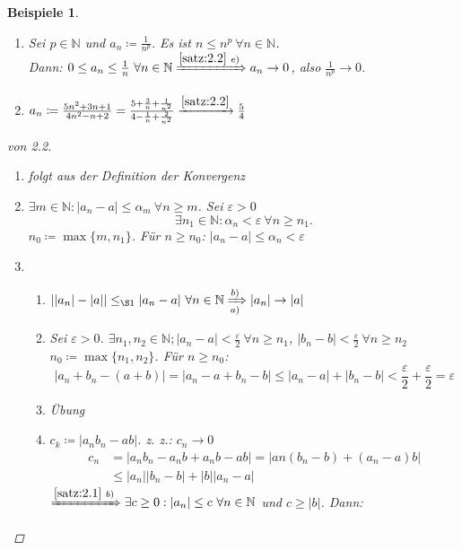 \documentclass[titlepage,ngerman,a4paper,headsepline,DIV15,halfparskip*,14pt]{scrartcl}
\newcommand{\N}{\mathbb{N}}
\theoremstyle{dotless}
\newtheorem*{beispiele}{Beispiele}
\begin{document}
\begin{beispiele}\
	\begin{enumerate}
		\item Sei $p \in \N$ und $a_{n} \coloneqq \frac{1}{n^{p}}$. Es ist $n \leq n^{p} ~\forall n \in \N$. \\
			Dann: $0 \leq a_{n} \leq \frac{1}{n} ~\forall n \in \N \xRightarrow[]{\ref{satz:2.2}~e)} a_{n} \rightarrow 0$, also $\frac{1}{n^{p}} \rightarrow 0$.
		\item $a_{n} \coloneqq \frac{5n^{2} + 3n + 1}{4n^{2} - n + 2} = \frac{5 + \frac{3}{n} + \frac{1}{n^{2}}}{4 - \frac{1}{n} + \frac{2}{n^{2}}} \xrightarrow[]{\ref{satz:2.2}} \frac{5}{4}$
	\end{enumerate}
	
	\begin{proof}[von 2.2]\
		\begin{enumerate}
			\item folgt aus der Definition der Konvergenz
			\item $\exists m \in \N: |a_{n} - a | \leq \alpha_{m} ~\forall n \geq m$. Sei $\varepsilon > 0$
				$$
		 		\exists n_{1} \in \N: \alpha_{n} < \varepsilon ~\forall n \geq n_{1}.
		 		$$
		 		$n_{0} \coloneqq \max \{ m , n_{1} \}$. Für $n \geq n_{0}$: $|a_{n} - a| \leq \alpha_{n} < \varepsilon$
			\item \begin{enumerate}
				\item $| |a_{n}| - |a|| \leq_{\S 1} |a_{n} - a| ~\forall n \in \N \xRightarrow[a)]{b)} |a_{n}| \rightarrow |a|$
				\item Sei $\varepsilon > 0$. $\exists n_{1}, n_{2} \in \N; |a_{n} - a| < \frac{\varepsilon}{2} ~\forall n \geq n_{1}$, $|b_{n} - b| < \frac{\varepsilon}{2} ~\forall n \geq n_{2}$ \\
					$n_{0} \coloneqq \max \{ n_{1}, n_{2} \}$. Für $n \geq n_{0}$:
					$$
						|a_{n} + b_{n} - (a + b)| = |a_{n} - a + b_{n} - b| \leq |a_{n} - a| + |b_{n} - b| < \frac{\varepsilon}{2} + \frac{\varepsilon}{2} = \varepsilon
					$$
				\item Übung
				\item $c_{k} \coloneqq |a_{n} b_{n} - ab|$. z. z.: $c_{n} \rightarrow 0$
					\begin{align*}
						c_{n} & = |a_{n}b_{n} - a_{n}b + a_{n}b - ab| = |a{n}(b_{n} - b)+ (a_{n} - a)b| \\
							  & \leq |a_{n}||b_{n} - b| + |b||a_{n}-a|
					\end{align*}
					$\xRightarrow[]{\ref{satz:2.1}~b)} \exists c \geq 0 : |a_{n}| \leq c ~\forall n \in \N$ und $c \geq |b|$. Dann:

\end{enumerate}
\end{enumerate}
\end{proof}
\end{beispiele}
\end{document}
